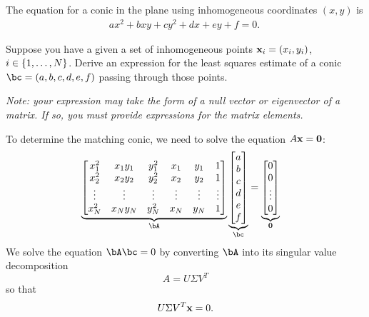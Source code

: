 \begin{problem}
  The equation for a conic in the plane using inhomogeneous
  coordinates $(x, y)$ is
  \begin{align}
    ax^2 + bxy + cy^2 + dx + ey + f = 0.~\label{eq:2.1}
  \end{align}

  \begin{enumalph}
    \item Suppose you have a given a set of inhomogeneous points
      $\mathbf{x}_i = (x_i, y_i)$, $i \in \left\{1, \ldots, N\right\}$.
      Derive an expression for the least squares estimate
      of a conic $\bc = (a, b, c, d, e, f)$ passing through those points.
      
      \step
      \emph{
        Note: your expression may take the form of a
        null vector or eigenvector of a matrix.
        If so, you must provide expressions
        for the matrix elements.
      }
      \begin{answer}
        To determine the matching conic, we need to solve the equation
        $A\mathbf{x} = \mathbf{0}$:
        \begin{align*}
          \underbrace{\begin{bmatrix}
            x_1^2 & x_1y_1 & y_1^2 & x_1 & y_1 & 1 \\
            x_2^2 & x_2y_2 & y_2^2 & x_2 & y_2 & 1 \\
            \vdots & \vdots & \vdots & \vdots & \vdots & \vdots \\
            x_N^2 & x_Ny_N & y_N^2 & x_N & y_N & 1 \\
          \end{bmatrix}}_{\bA}
          \underbrace{\begin{bmatrix}
            a \\
            b \\
            c \\
            d \\
            e \\
            f \\
          \end{bmatrix}}_{\bc}
          &=
          \underbrace{\begin{bmatrix}
            0 \\
            0 \\
            \vdots \\
            0 \\
          \end{bmatrix}}_{\mathbf{0}}
        \end{align*}
        We solve the equation $\bA\bc = 0$ by converting $\bA$ into
        its singular value decomposition
        \[
          A = U \Sigma V^T
        \]
        so that
        \[
          U \Sigma V^T \mathbf{x} = 0.
        \]


\end{answer}
\end{enumalph}
\end{problem}
